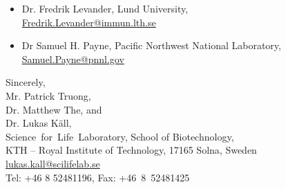 \documentclass[a4paper]{letter}
\begin{document}
\begin{letter}{}
\begin{itemize}
\item Dr. Fredrik Levander, Lund University,\\
\url{Fredrik.Levander@immun.lth.se}

\item Dr Samuel H. Payne, Pacific Northwest National Laboratory, \\
\url{Samuel.Payne@pnnl.gov}

\end{itemize}

\vspace*{1.5em}

Sincerely,\\[2em]
Mr. Patrick Truong,\\
Dr. Matthew The, and\\
Dr. Lukas K\"all, \\
Science~for~Life~Laboratory, School of Biotechnology,\\
KTH -- Royal Institute of Technology, 17165 Solna, Sweden\\
\url{lukas.kall@scilifelab.se}\\
Tel: +46 8 52481196, Fax: +46~8~52481425

\end{letter}
\end{document}
